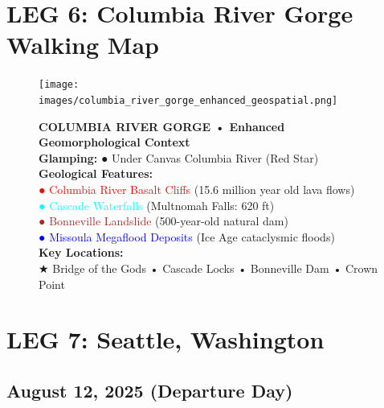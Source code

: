 \documentclass[
  10pt,
]{article}
\begin{document}
\newpage

\section{\texorpdfstring{\textcolor{primary}{LEG 6: Columbia River Gorge Walking Map}}{}}\label{section-45}

\begin{figure}[h]
\centering
\texttt{[image: images/columbia\_river\_gorge\_enhanced\_geospatial.png]}
\caption{\textbf{\textcolor{primary}{COLUMBIA RIVER GORGE • Enhanced Geomorphological Context}} \\ 
\textbf{\textcolor{secondary}{Glamping:}} \textcolor{mapred}{●} Under Canvas Columbia River (Red Star) \\
\textbf{\textcolor{secondary}{Geological Features:}} \\
\textcolor{red}{●} \textcolor{red}{Columbia River Basalt Cliffs} (15.6 million year old lava flows) \\
\textcolor{cyan}{●} \textcolor{cyan}{Cascade Waterfalls} (Multnomah Falls: 620 ft) \\
\textcolor{brown}{●} \textcolor{brown}{Bonneville Landslide} (500-year-old natural dam) \\
\textcolor{blue}{●} \textcolor{blue}{Missoula Megaflood Deposits} (Ice Age cataclysmic floods) \\
\textbf{\textcolor{secondary}{Key Locations:}} \\
\textcolor{mapred}{★} Bridge of the Gods • Cascade Locks • Bonneville Dam • Crown Point}
\end{figure}

\newpage

\section{\texorpdfstring{\textcolor{primary}{LEG 7: Seattle, Washington}}{}}\label{section-46}

\subsection{\texorpdfstring{\textcolor{secondary}{August 12, 2025 (Departure Day)}}{}}\label{section-47}
\end{document}
